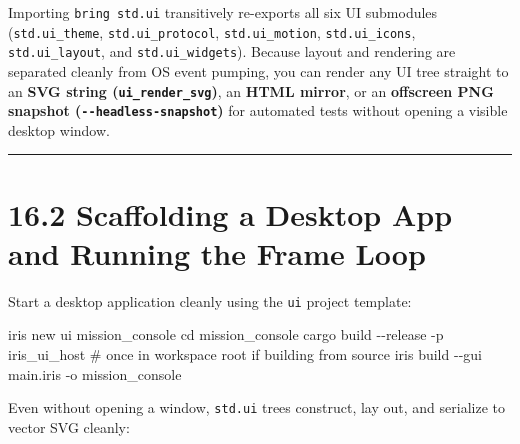 \documentclass[
  english,
  oneside]{book}
\newenvironment{Shaded}{\begin{snugshade}}{\end{snugshade}}
\newcommand{\NormalTok}[1]{\textcolor[rgb]{0.83,0.83,0.83}{#1}}
\begin{document}
Importing \texttt{bring\ std.ui} transitively re-exports all six UI
submodules (\texttt{std.ui\_theme}, \texttt{std.ui\_protocol},
\texttt{std.ui\_motion}, \texttt{std.ui\_icons},
\texttt{std.ui\_layout}, and \texttt{std.ui\_widgets}). Because layout
and rendering are separated cleanly from OS event pumping, you can
render any UI tree straight to an \textbf{SVG string
(\texttt{ui\_render\_svg})}, an \textbf{HTML mirror}, or an
\textbf{offscreen PNG snapshot (\texttt{-\/-headless-snapshot})} for
automated tests without opening a visible desktop window.

\begin{center}\rule{0.5\linewidth}{0.5pt}\end{center}

\section{16.2 Scaffolding a Desktop App and Running the Frame
Loop}\label{scaffolding-a-desktop-app-and-running-the-frame-loop}

Start a desktop application cleanly using the \texttt{ui} project
template:

\begin{Shaded}
\begin{Highlighting}[]
\NormalTok{iris new ui mission\_console}
\NormalTok{cd mission\_console}
\NormalTok{cargo build {-}{-}release {-}p iris\_ui\_host   \# once in workspace root if building from source}
\NormalTok{iris build {-}{-}gui main.iris {-}o mission\_console}
\end{Highlighting}
\end{Shaded}

Even without opening a window, \texttt{std.ui} trees construct, lay out,
and serialize to vector SVG cleanly:
\end{document}
